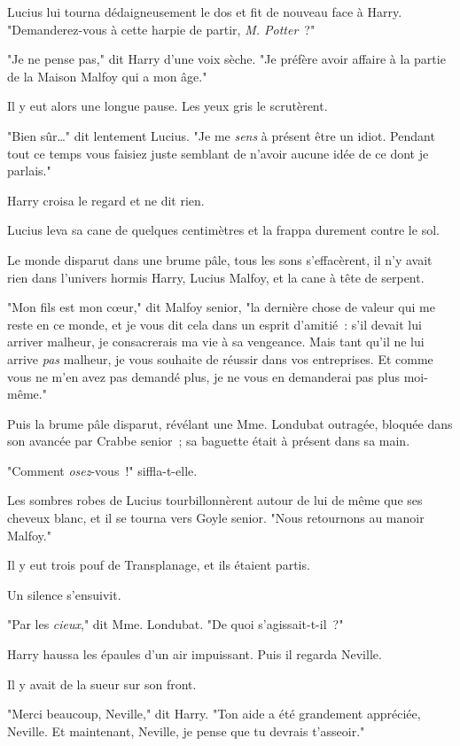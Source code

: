 Lucius lui tourna dédaigneusement le dos et fit de nouveau face à Harry. "Demanderez-vous à cette harpie de partir, \emph{M. Potter}~?"

"Je ne pense pas," dit Harry d'une voix sèche. "Je préfère avoir affaire à la partie de la Maison Malfoy qui a mon âge."

Il y eut alors une longue pause. Les yeux gris le scrutèrent.

"Bien sûr…" dit lentement Lucius. "Je me \emph{sens} à présent être un idiot. Pendant tout ce temps vous faisiez juste semblant de n'avoir aucune idée de ce dont je parlais."

Harry croisa le regard et ne dit rien.

Lucius leva sa cane de quelques centimètres et la frappa durement contre le sol.

Le monde disparut dans une brume pâle, tous les sons s'effacèrent, il n'y avait rien dans l'univers hormis Harry, Lucius Malfoy, et la cane à tête de serpent.

"Mon fils est mon cœur," dit Malfoy senior, "la dernière chose de valeur qui me reste en ce monde, et je vous dit cela dans un esprit d'amitié~: s'il devait lui arriver malheur, je consacrerais ma vie à sa vengeance. Mais tant qu'il ne lui arrive \emph{pas} malheur, je vous souhaite de réussir dans vos entreprises. Et comme vous ne m'en avez pas demandé plus, je ne vous en demanderai pas plus moi-même."

Puis la brume pâle disparut, révélant une Mme. Londubat outragée, bloquée dans son avancée par Crabbe senior~; sa baguette était à présent dans sa main.

"Comment \emph{osez}-vous~!" siffla-t-elle.

Les sombres robes de Lucius tourbillonnèrent autour de lui de même que ses cheveux blanc, et il se tourna vers Goyle senior. "Nous retournons au manoir Malfoy."

Il y eut trois pouf de Transplanage, et ils étaient partis.

Un silence s'ensuivit.

"Par les \emph{cieux}," dit Mme. Londubat. "De quoi s'agissait-t-il~?"

Harry haussa les épaules d'un air impuissant. Puis il regarda Neville.

Il y avait de la sueur sur son front.

"Merci beaucoup, Neville," dit Harry. "Ton aide a été grandement appréciée, Neville. Et maintenant, Neville, je pense que tu devrais t'asseoir."

